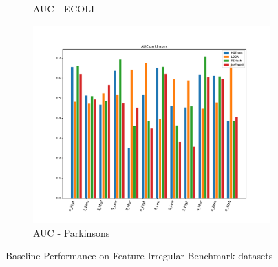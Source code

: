 \begin{figure}[ht!]
\begin{subfigure}[t]{0.32\textwidth}
        \caption{AUC - ECOLI}
    \end{subfigure}
		\hfill
    \begin{subfigure}[t]{0.32\textwidth}
        \centering
        \includegraphics[width=\linewidth]{fig/baseline/parkinsons.pdf}
        \caption{AUC - Parkinsons}
    \end{subfigure}
		\hfill
    \caption{Baseline Performance on Feature Irregular Benchmark datasets}
\end{figure}

